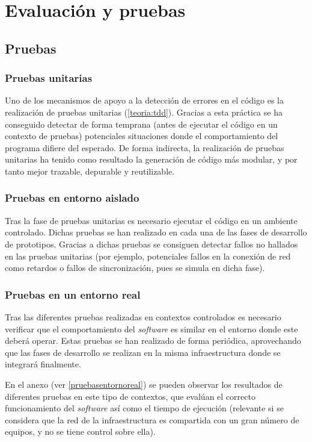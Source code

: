 \chapter{Evaluación y pruebas}
\label{chapter:evaluaciones}
\section{Pruebas}

\subsection{Pruebas unitarias}

Uno de los mecanismos de apoyo a la detección de errores en el código es la realización de pruebas unitarias (\ref{teoria:tdd}). Gracias a esta práctica se ha conseguido detectar de forma temprana (antes de ejecutar el código en un contexto de pruebas) potenciales situaciones donde el comportamiento del programa difiere del esperado. De forma indirecta, la realización de pruebas unitarias ha tenido como resultado la generación de código más modular, y por tanto mejor trazable, depurable y reutilizable.

\subsection{Pruebas en entorno aislado}

Tras la fase de pruebas unitarias es necesario ejecutar el código en un ambiente controlado. Dichas pruebas se han realizado en cada una de las fases de desarrollo de prototipos. Gracias a dichas pruebas se consiguen detectar fallos no hallados en las pruebas unitarias (por ejemplo, potenciales fallos en la conexión de red como retardos o fallos de sincronización, pues se simula en dicha fase).

\subsection{Pruebas en un entorno real}

Tras las diferentes pruebas realizadas en contextos controlados es necesario verificar que el comportamiento del \textit{software} es similar en el entorno donde este deberá operar. Estas pruebas se han realizado de forma periódica, aprovechando que las fases de desarrollo se realizan en la misma infraestructura donde se integrará finalmente.

En el anexo  (ver \ref{pruebasentornoreal}) se pueden observar los resultados de diferentes pruebas en este tipo de contextos, que evalúan el correcto funcionamiento del \textit{software} así como el tiempo de ejecución (relevante si se considera que la red de la infraestructura es compartida con un gran número de equipos, y no se tiene control sobre ella).


